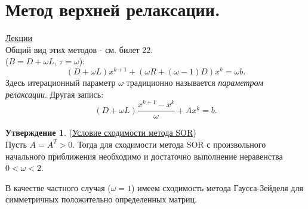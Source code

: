 \documentclass[specialist, subf, href, colorlinks=true, 12pt, times, mtpro, final]{disser}
\theoremstyle{definition}
\newtheorem{state}{Утверждение}[section]
\begin{document}
{\section {Метод верхней релаксации.}
    \hyperlink {lects.67}{Лекции}\\
    Общий вид этих методов - см. билет 22.\\
     ($B = D + \omega L, \, \tau = \omega$):
    $$
        (D+\omega L)x^{k+1} + (\omega R + (\omega - 1)D)x^{k} = \omega b.
    $$
    Здесь итерационный параметр $\omega$ традиционно называется {\it параметром релаксации}.
    Другая запись:
    $$
        (D+\omega L)\frac{x^{k+1}-x^{k}}{\omega} + Ax^{k} = b.
    $$
    \begin{state} (\hyperlink {lects.67}{Условие сходимости метода SOR})\\
    Пусть $A = A^T > 0$. Тогда для сходимости метода SOR с произвольного начального
    приближения необходимо и достаточно выполнение неравенства $0 < \omega < 2$.
    \end{state}
    В качестве частного случая ($\omega = 1$) имеем сходимость метода Гаусса-Зейделя для
    симметричных положительно определенных матриц.

}
\end{document}
